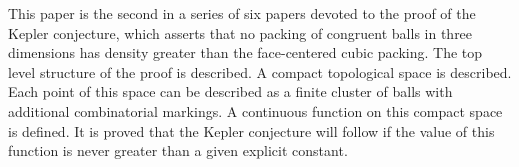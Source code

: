 This paper is the second in a series of six papers devoted to the
proof of the Kepler conjecture, which asserts that no packing of
congruent balls in three dimensions has density greater than the
face-centered cubic packing.   The top level structure of the proof
is described. A compact topological space is described. Each point
of this space can be described as a finite cluster of balls with
additional combinatorial markings.  A continuous function on this
compact space is defined.  It is proved that the Kepler conjecture
will follow if the value of this function is never greater than a
given explicit constant.
